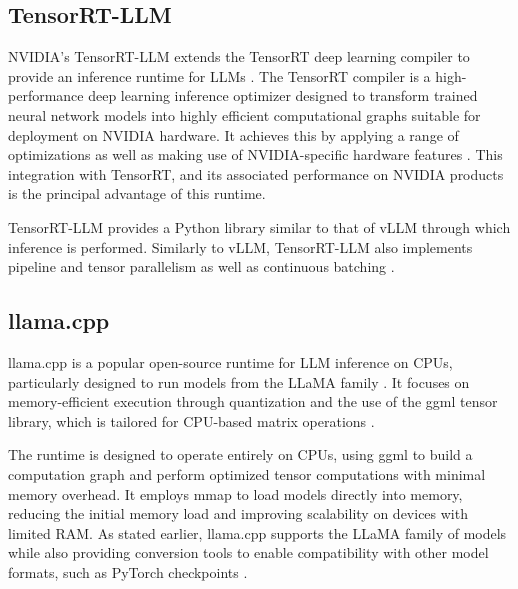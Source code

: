 \documentclass[12pt,twoside]{report}
\begin{document}
\subsection{TensorRT-LLM}
NVIDIA's TensorRT-LLM extends the TensorRT deep learning compiler to provide an inference runtime for LLMs \cite{nvidiainferencewhitepaper}.
The TensorRT compiler is a high-performance deep learning inference optimizer designed to transform trained neural network models into highly efficient computational graphs suitable for deployment on NVIDIA hardware. 
It achieves this by applying a range of optimizations as well as making use of NVIDIA-specific hardware features \cite{nvidiainferencewhitepaper}. 
This integration with TensorRT, and its associated performance on NVIDIA products is the principal advantage of this runtime.

TensorRT-LLM provides a Python library similar to that of vLLM through which inference is performed.
Similarly to vLLM, TensorRT-LLM also implements pipeline and tensor parallelism as well as continuous batching \cite{nvidiainferencewhitepaper}.

\subsection{llama.cpp}\label{subsection:llama.cpp}

llama.cpp is a popular open-source runtime for LLM inference on CPUs, particularly designed to run models from the LLaMA family \cite{touvron2023llama}. 
It focuses on memory-efficient execution through quantization and the use of the ggml tensor library, which is tailored for CPU-based matrix operations \cite{ggml}.

The runtime is designed to operate entirely on CPUs, using ggml to build a computation graph and perform optimized tensor computations with minimal memory overhead. 
It employs mmap to load models directly into memory, reducing the initial memory load and improving scalability on devices with limited RAM. 
As stated earlier, llama.cpp supports the LLaMA family of models while also providing conversion tools to enable compatibility with other model formats, such as PyTorch checkpoints \cite{paszke2019pytorch}.
\end{document}
